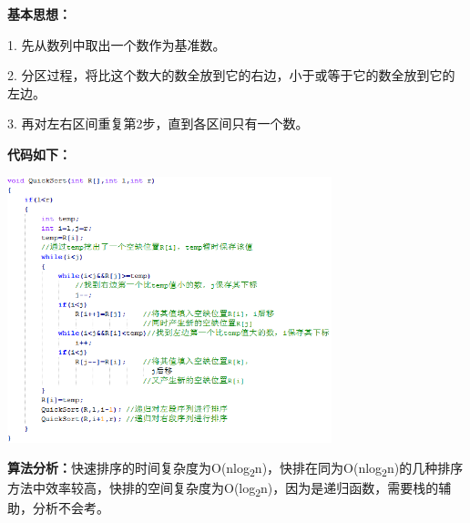 {\textbf{基本思想：}}

{1. 先从数列中取出一个数作为基准数。}

{2.
分区过程，将比这个数大的数全放到它的右边，小于或等于它的数全放到它的左边。}

{3. 再对左右区间重复第2步，直到各区间只有一个数。}

{\textbf{代码如下：}}

{\textbf{\includegraphics[width=3.70833in,height=3.04167in]{png-jpeg-pics/48AE513E40803512100E36ECD2D64C7E.png}\\
}}

{\textbf{算法分析：}}{快速排序的时间复杂度为O(nlog}\textsubscript{2}{n)，快排在同为O(nlog}\textsubscript{2}{n)的几种排序方法中效率较高，}{快排的空间复杂度为}{O(log\textsubscript{2}n)}{，因为是递归函数，需要栈的辅助，分析不会考。}
